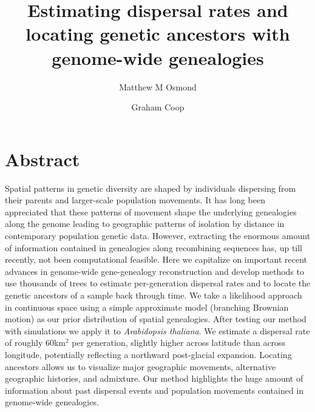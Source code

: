 \documentclass[12pt]{article}
\title{Estimating dispersal rates and locating genetic ancestors with genome-wide genealogies}
\author[1]{Matthew M Osmond}
\author[2]{Graham Coop}
\affil[1]{Department of Ecology \& Evolutionary Biology, University of Toronto}
\affil[2]{Department of Evolution \& Ecology and Center for Population Biology, University of California - Davis}
\date{}
\begin{document}

\maketitle

\section*{Abstract}

Spatial patterns in genetic diversity are shaped by individuals dispersing from their parents and larger-scale population movements. 
It has long been appreciated that these patterns of movement shape the underlying genealogies along the genome leading to geographic patterns of isolation by distance in contemporary population genetic data.
However, extracting the enormous amount of information contained in genealogies along recombining sequences has, up till recently, not been computational feasible.
Here we capitalize on important recent advances in genome-wide gene-genealogy reconstruction and develop methods to use thousands of trees to estimate per-generation dispersal rates and to locate the genetic ancestors of a sample back through time.
We take a likelihood approach in continuous space using a simple approximate model (branching Brownian motion) as our prior distribution of spatial genealogies. 
After testing our method with simulations we apply it to \textit{Arabidopsis thaliana}. 
We estimate a dispersal rate of roughly $60$km$^2$ per generation, slightly higher across latitude than across longitude, potentially reflecting a northward post-glacial expansion.
Locating ancestors allows us to visualize major geographic movements, alternative geographic histories, and admixture.
Our method highlights the huge amount of information about past dispersal events and population movements contained in genome-wide genealogies.  
\end{document}
